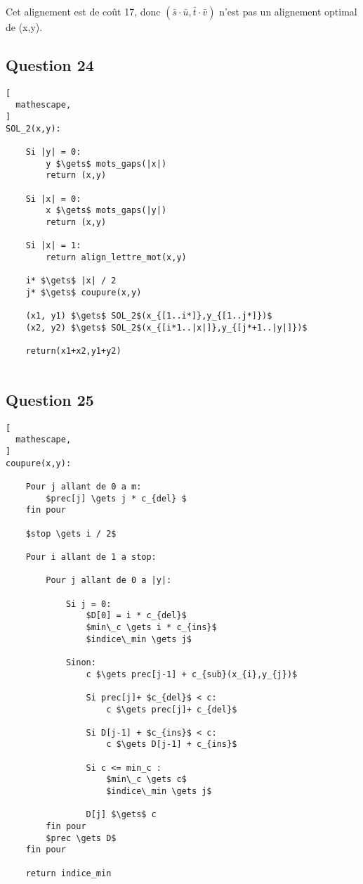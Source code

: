 \documentclass{report}
\begin{document}
Cet alignement est de coût 17, donc $(\bar{s}\cdot\bar{u},\bar{t}\cdot\bar{v})$ n'est pas un alignement optimal de (x,y).

\clearpage

\subsection*{Question 24}
\begin{lstlisting}[
  mathescape,
]
SOL_2(x,y):

    Si |y| = 0:
        y $\gets$ mots_gaps(|x|)
        return (x,y)
        
    Si |x| = 0:
        x $\gets$ mots_gaps(|y|)
        return (x,y)
        
    Si |x| = 1:
        return align_lettre_mot(x,y)
        
    i* $\gets$ |x| / 2
    j* $\gets$ coupure(x,y)
    
    (x1, y1) $\gets$ SOL_2$(x_{[1..i*]},y_{[1..j*]})$
    (x2, y2) $\gets$ SOL_2$(x_{[i*1..|x|]},y_{[j*+1..|y|]})$
    
    return(x1+x2,y1+y2)
        
\end{lstlisting}

\clearpage
\subsection*{Question 25}

\begin{lstlisting}[
  mathescape,
]
coupure(x,y):

    Pour j allant de 0 a m:
        $prec[j] \gets j * c_{del} $
    fin pour
    
    $stop \gets i / 2$
    
    Pour i allant de 1 a stop:
    
        Pour j allant de 0 a |y|:
        
            Si j = 0:
                $D[0] = i * c_{del}$
                $min\_c \gets i * c_{ins}$
                $indice\_min \gets j$
                
            Sinon:
                c $\gets prec[j-1] + c_{sub}(x_{i},y_{j})$
                    
                Si prec[j]+ $c_{del}$ < c:
                    c $\gets prec[j]+ c_{del}$

                Si D[j-1] + $c_{ins}$ < c:
                    c $\gets D[j-1] + c_{ins}$
                    
                Si c <= min_c :
                    $min\_c \gets c$
                    $indice\_min \gets j$
                        
                D[j] $\gets$ c
        fin pour
        $prec \gets D$
    fin pour
    
    return indice_min

\end{lstlisting}
\end{document}
